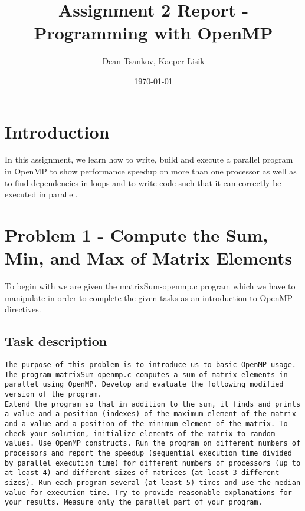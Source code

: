 \documentclass[a4paper,11pt]{article}
\begin{document}
\title{
    \textbf{Assignment 2 Report - Programming with OpenMP}
}
\author{Dean Tsankov, Kacper Lisik}
\date{\today}

\maketitle

\section*{Introduction}

In this assignment, we learn how to write, build and execute a parallel program in OpenMP to show performance speedup on more than one processor as well as to find dependencies in loops and to write code such that it can correctly be executed in parallel.

\section*{Problem 1 - Compute the Sum, Min, and Max of Matrix Elements}

To begin with we are given the matrixSum-openmp.c program which we have to manipulate in order to complete the given tasks as an introduction to OpenMP directives.

\subsection*{Task description}

\begin{verbatim}
The purpose of this problem is to introduce us to basic OpenMP usage. The program matrixSum-openmp.c computes a sum of matrix elements in parallel using OpenMP. Develop and evaluate the following modified version of the program.
Extend the program so that in addition to the sum, it finds and prints a value and a position (indexes) of the maximum element of the matrix and a value and a position of the minimum element of the matrix. To check your solution, initialize elements of the matrix to random values. Use OpenMP constructs. Run the program on different numbers of processors and report the speedup (sequential execution time divided by parallel execution time) for different numbers of processors (up to at least 4) and different sizes of matrices (at least 3 different sizes). Run each program several (at least 5) times and use the median value for execution time. Try to provide reasonable explanations for your results. Measure only the parallel part of your program.
\end{verbatim}
\end{document}

